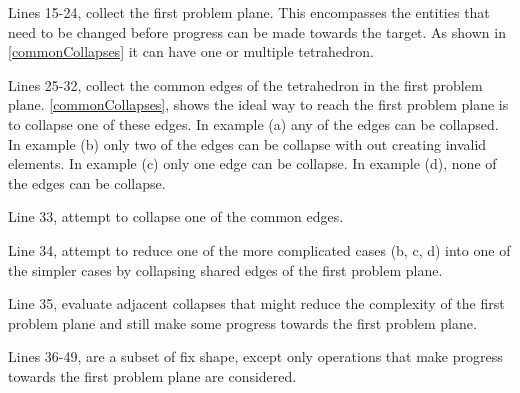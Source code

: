 \documentclass{article}
\begin{document}
Lines 15-24, collect the first problem plane. This encompasses the entities that need to be changed before progress can be made towards the target. As shown in \autoref{commonCollapses} it can have one or multiple tetrahedron.

Lines 25-32, collect the common edges of the tetrahedron in the first problem plane. \autoref{commonCollapses}, shows the ideal way to reach the first problem plane is to collapse one of these edges. In example (a) any of the edges can be collapsed. In example (b) only two of the edges can be collapse with out creating invalid elements. In example (c) only one edge can be collapse. In example (d), none of the edges can be collapse.

Line 33, attempt to collapse one of the common edges.

Line 34, attempt to reduce one of the more complicated cases (b, c, d) into one of the simpler cases by collapsing shared edges of the first problem plane.

Line 35, evaluate adjacent collapses that might reduce the complexity of the first problem plane and still make some progress towards the first problem plane.

Lines 36-49, are a subset of fix shape, except only operations that make progress towards the first problem plane are considered.
\end{document}
